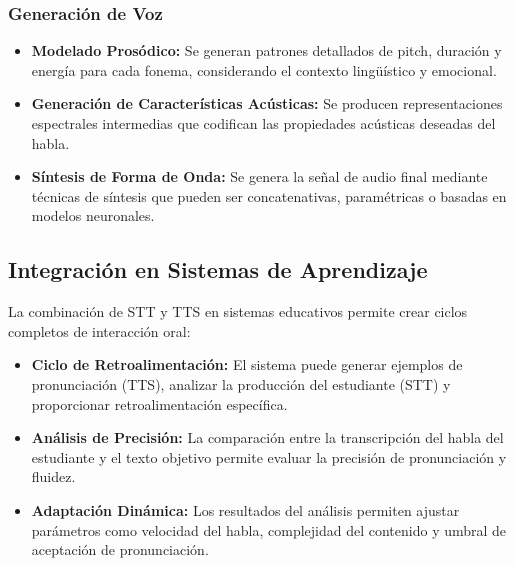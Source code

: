 \subsubsection{Generación de Voz}

\begin{itemize}
  \item \textbf{Modelado Prosódico:} Se generan patrones detallados de pitch, duración y energía para cada fonema, considerando el contexto lingüístico y emocional.

  \item \textbf{Generación de Características Acústicas:} Se producen representaciones espectrales intermedias que codifican las propiedades acústicas deseadas del habla.

  \item \textbf{Síntesis de Forma de Onda:} Se genera la señal de audio final mediante técnicas de síntesis que pueden ser concatenativas, paramétricas o basadas en modelos neuronales.
\end{itemize}

\subsection{Integración en Sistemas de Aprendizaje}

La combinación de STT y TTS en sistemas educativos permite crear ciclos completos de interacción oral:

\begin{itemize}
  \item \textbf{Ciclo de Retroalimentación:} El sistema puede generar ejemplos de pronunciación (TTS), analizar la producción del estudiante (STT) y proporcionar retroalimentación específica.

  \item \textbf{Análisis de Precisión:} La comparación entre la transcripción del habla del estudiante y el texto objetivo permite evaluar la precisión de pronunciación y fluidez.

  \item \textbf{Adaptación Dinámica:} Los resultados del análisis permiten ajustar parámetros como velocidad del habla, complejidad del contenido y umbral de aceptación de pronunciación.
\end{itemize}